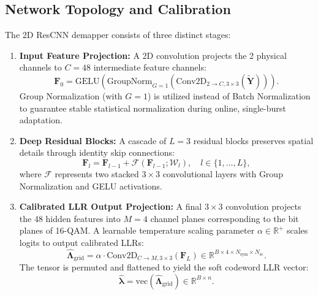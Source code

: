 \documentclass[journal]{IEEEtran}
\begin{document}
\subsection{Network Topology and Calibration}
The 2D ResCNN demapper consists of three distinct stages:
\begin{enumerate}
    \item \textbf{Input Feature Projection:} A 2D convolution projects the 2 physical channels to $C = 48$ intermediate feature channels:
    \begin{equation}
        \mathbf{F}_0 = \text{GELU}\left(\text{GroupNorm}_{G=1}\left(\text{Conv2D}_{2 \to C, 3\times3}(\tilde{\mathbf{Y}})\right)\right).
    \end{equation}
    Group Normalization (with $G=1$) is utilized instead of Batch Normalization to guarantee stable statistical normalization during online, single-burst adaptation.
    \item \textbf{Deep Residual Blocks:} A cascade of $L = 3$ residual blocks preserves spatial details through identity skip connections:
    \begin{equation}
        \mathbf{F}_l = \mathbf{F}_{l-1} + \mathcal{F}(\mathbf{F}_{l-1}; \mathcal{W}_l), \quad l \in \{1, \dots, L\},
    \end{equation}
    where $\mathcal{F}$ represents two stacked $3 \times 3$ convolutional layers with Group Normalization and GELU activations.
    \item \textbf{Calibrated LLR Output Projection:} A final $3 \times 3$ convolution projects the 48 hidden features into $M = 4$ channel planes corresponding to the bit planes of 16-QAM. A learnable temperature scaling parameter $\alpha \in \mathbb{R}^+$ scales logits to output calibrated LLRs:
    \begin{equation}
        \hat{\boldsymbol{\Lambda}}_{\text{grid}} = \alpha \cdot \text{Conv2D}_{C \to M, 3\times3}(\mathbf{F}_L) \in \mathbb{R}^{B \times 4 \times N_{\text{sym}} \times N_{\text{sc}}}.
    \end{equation}
    The tensor is permuted and flattened to yield the soft codeword LLR vector:
    \begin{equation}
        \hat{\boldsymbol{\lambda}} = \text{vec}\left(\hat{\boldsymbol{\Lambda}}_{\text{grid}}\right) \in \mathbb{R}^{B \times n}.
    \end{equation}
\end{enumerate}
\end{document}
